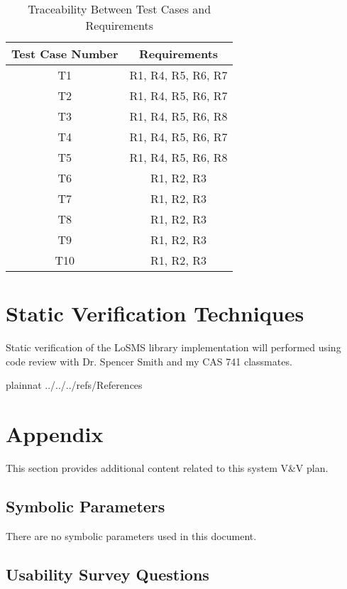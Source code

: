 \documentclass[12pt, titlepage]{article}
\newcommand{\famname}{LoSMS} %
\begin{document}
\begin{table} [h!]
	\centering
	\begin{tabular}{|c|c|}
		\hline	
		\textbf{Test Case Number} & \textbf{Requirements}\\
		\hline 
		T1& R1, R4, R5, R6, R7\\ \hline
		T2& R1, R4, R5, R6, R7\\ \hline
		T3& R1, R4, R5, R6, R8\\ \hline
		T4& R1, R4, R5, R6, R7\\ \hline
		T5& R1, R4, R5, R6, R8\\ \hline
		T6& R1, R2, R3\\ \hline
		T7& R1, R2, R3\\ \hline
		T8& R1, R2, R3\\ \hline
		T9& R1, R2, R3\\ \hline
		T10& R1, R2, R3\\ \hline
	\end{tabular}
	\caption{Traceability Between Test Cases and Requirements}
	\label{Table:Traceability} 
\end{table}

\section{Static Verification Techniques} \label{StaticVerTechniques}

Static verification of the \famname{} library implementation will performed 
using code review with Dr. Spencer Smith and my CAS 741 classmates.

\newpage
				
 {plainnat}
 {../../../refs/References}

\newpage

\section{Appendix}

This section provides additional content related to this system V\&V plan.

\subsection{Symbolic Parameters}

There are no symbolic parameters used in this document.

\subsection{Usability Survey Questions} \label{UsabilityTesting}
\end{document}
